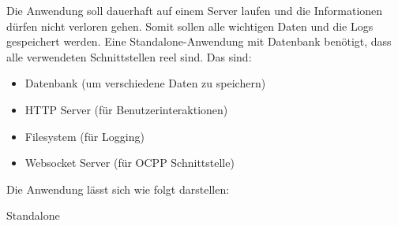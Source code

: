 Die Anwendung soll dauerhaft auf einem Server laufen und die Informationen dürfen nicht verloren gehen.
Somit sollen alle wichtigen Daten und die Logs gespeichert werden. 
Eine Standalone-Anwendung mit Datenbank benötigt, dass alle verwendeten Schnittstellen reel sind. Das sind:
\begin{itemize}
    \item Datenbank (um verschiedene Daten zu speichern)
    \item HTTP Server (für Benutzerinteraktionen)
    \item Filesystem (für Logging)
    \item Websocket Server (für OCPP Schnittstelle)
\end{itemize}
Die Anwendung lässt sich wie folgt darstellen:

{Standalone}